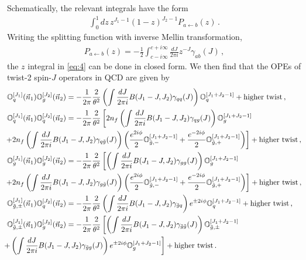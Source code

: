\documentclass[letterpaper,11pt]{article}
\begin{document}
Schematically, the relevant integrals have the form
\begin{align}
  \label{eq:4}
  \int_0^1 dz\, z^{J_1 - 1} (1-z)^{J_2 - 1} P_{a \leftarrow b}(z) \,.
\end{align}
Writing the splitting function with inverse Mellin transformation,
\begin{align}
  \label{eq:5}
  P_{a \leftarrow b}(z) = - \frac{1}{2} \int_{c - i \infty}^{c + i \infty} \frac{d J}{2 \pi i} z^{-J} \gamma_{ab}(J) \,,
\end{align}
the $z$ integral in \eqref{eq:4} can be done in closed form. 
We then find that the OPEs of twist-2 spin-$J$ operators in QCD are given by
\begin{align}
\mathbb{O}_{q}^{[J_1]}(\vec{n}_1) \mathbb{O}_{g}^{[J_2]}(\vec{n}_2)
&=-\frac{1}{2\pi} \frac{2}{\theta^2}\left( \int \frac{dJ}{2\pi i} B(J_1-J,J_2) \gamma_{qq}(J)\right) \mathbb{O}_{q}^{[J_1+J_2-1]}+\text{higher twist}\,,\nonumber\\
\mathbb{O}_{q}^{[J_1]}(\vec{n}_1) \mathbb{O}_{q}^{[J_2]}(\vec{n}_2)
&= -\frac{1}{2\pi}\frac{2}{\theta^2} \left[2n_f \left( \int\frac{dJ}{2\pi i} B(J_1-J,J_2) \gamma_{qg}(J) \right)\mathbb{O}_{g}^{[J_1+J_2-1]}\right. \nonumber\\
&\hspace{-3cm} \; \left. + 2n_f \left( \int \frac{dJ}{2\pi i} B(J_1-J,J_2) \gamma_{q\tilde{g}}(J) \right) 
\left(\frac{e^{2i\phi}}{2}\mathbb{O}_{\tilde{g},-}^{[J_1+J_2-1]}+\frac{e^{-2i\phi}}{2}\mathbb{O}_{\tilde{g},+}^{[J_1+J_2-1]}\right)   \right]
+\text{higher twist}\,,\nonumber\\
\mathbb{O}_{g}^{[J_1]}(\vec{n}_1) \mathbb{O}_{g}^{[J_2]}(\vec{n}_2)
&=-\frac{1}{2\pi}\frac{2}{\theta^2}\left[ \left(\int \frac{dJ}{2\pi i} B(J_1-J,J_2)\gamma_{gg}(J) \right) \mathbb{O}_{g}^{[J_1+J_2-1]}\right. \nonumber\\
&\hspace{-3cm} \; \left. + 2n_f \left( \int \frac{dJ}{2\pi i} B(J_1-J,J_2) \gamma_{g\tilde{g}}(J) \right) 
\left(\frac{e^{2i\phi}}{2}\mathbb{O}_{\tilde{g},-}^{[J_1+J_2-1]}+\frac{e^{-2i\phi}}{2}\mathbb{O}_{\tilde{g},+}^{[J_1+J_2-1]}\right)   \right]
+\text{higher twist}\,,\nonumber\\
\mathbb{O}_{\tilde{g},\pm}^{[J_1]}(\vec{n}_1)\mathbb{O}_{q}^{[J_2]}(\vec{n}_2)
&= -\frac{1}{2\pi} \frac{2}{\theta^2} \left( \int \frac{dJ}{2\pi i} B(J_1-J,J_2)\gamma_{\tilde{g}q}\right) e^{\pm 2i\phi} \mathbb{O}_{q}^{[J_1+J_2-1]} +\text{higher twist}\,, \nonumber\\
\mathbb{O}_{\tilde{g},\pm}^{[J_1]}(\vec{n}_1)\mathbb{O}_{g}^{[J_2]}(\vec{n}_2)
&=-\frac{1}{2\pi}\frac{2}{\theta^2}\left[ \left(\int\frac{dJ}{2\pi i} B(J_1-J,J_2) \gamma_{\tilde{g}\tilde{g}}(J)\right)\mathbb{O}_{\tilde{g},\pm}^{[J_1+J_2-1]} \right. \nonumber\\
& \hspace{-3cm} \left. +    \left(\int\frac{dJ}{2\pi i} B(J_1-J,J_2) \gamma_{\tilde{g}g}(J)\right)e^{\pm 2i\phi}\mathbb{O}_{g}^{[J_1+J_2-1]}    \right]+\text{higher twist}\,.
\end{align}
\end{document}
